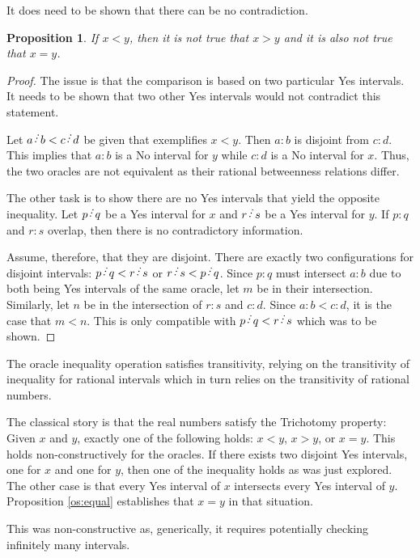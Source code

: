 \documentclass[12pt]{article}
\newtheorem{proposition}{Proposition}[section]
\begin{document}
It does need to be shown that there can be no contradiction. 

\begin{proposition}
    If $x < y$, then it is not true that $x > y$ and it is also not true that $x = y$.
\end{proposition}

\begin{proof}
    The issue is that the comparison is based on two particular Yes intervals. It needs to be shown that two other Yes intervals would not contradict this statement. 

    Let $a\lte b < c\lte d$ be given that exemplifies $x<y$. Then $a:b$ is disjoint from $c:d$. This implies that $a:b$ is a No interval for $y$ while $c:d$ is a No interval for $x$. Thus, the two oracles are not equivalent as their rational betweenness relations differ.

    The other task is to show there are no Yes intervals that yield the opposite inequality. Let $p\lte q$ be a Yes interval for $x$ and $r \lte s$ be a Yes interval for $y$. If $p:q$ and $r:s$ overlap, then there is no contradictory information. 

    Assume, therefore, that they are disjoint. There are exactly two configurations for disjoint intervals: $p \lte q < r \lte s$ or $ r \lte s < p \lte q$. Since $p:q$ must intersect $a:b$ due to both being Yes intervals of the same oracle, let $m$ be in their intersection. Similarly, let $n$ be in the intersection of $r:s$ and $c:d$. Since $a:b < c:d$, it is the case that $m < n$. This is only compatible with $p \lte q < r \lte s$ which was to be shown. 

\end{proof}

The oracle inequality operation satisfies transitivity, relying on the transitivity of inequality for rational intervals which in turn relies on the transitivity of rational numbers. 

The classical story is that the real numbers satisfy the Trichotomy property: Given $x$ and $y$, exactly one of the following holds: $x<y$, $x>y$, or $x=y$. This holds non-constructively for the oracles. If there exists two disjoint Yes intervals, one for $x$ and one for $y$, then one of the inequality holds as was just explored. The other case is that every Yes interval of $x$ intersects every Yes interval of $y$. Proposition \ref{os:equal} establishes that $x=y$ in that situation. 
 

This was non-constructive as, generically, it requires potentially checking infinitely many intervals. 
\end{document}
